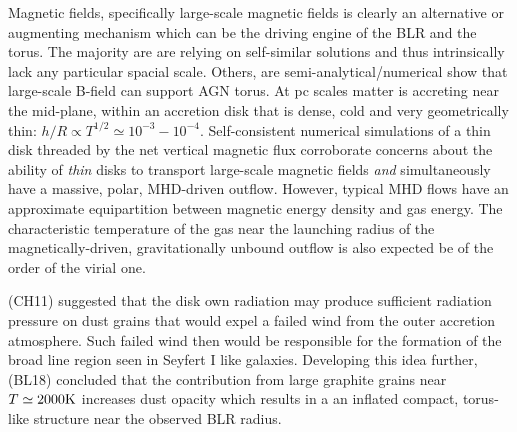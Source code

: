 \documentclass[12pt,english,preprint]{aastex}
\begin{document}
Magnetic fields, specifically large-scale magnetic fields 
is clearly an alternative or augmenting mechanism which can be the driving engine of the BLR and the torus. 
The majority are are relying on self-similar solutions \citep{Emmering92,Everett05,Keating12,KoniglKartje94} and thus intrinsically
lack any particular spacial scale. Others, are semi-analytical/numerical \citep{Lovelace98,Dorodnitsyn16} 
show that large-scale B-field can support AGN torus. At pc scales matter is accreting near the mid-plane, within an accretion
disk that is dense, cold and very geometrically thin: $h/R\propto T^{1/2}\simeq10^{-3}-10^{-4}$. 
Self-consistent numerical simulations of a 
thin disk threaded by the net vertical magnetic flux \citep{ZhuStone2018} corroborate concerns about the ability of \emph{thin} disks to 
transport large-scale magnetic fields \citep{LubowPapaloizou94,BKLovelace2000,BKLovelace2007} \emph{and} simultaneously have a 
massive, polar, MHD-driven outflow. However, typical MHD flows have an approximate equipartition between magnetic energy density and 
gas energy. The characteristic temperature of the gas near the launching radius of the magnetically-driven, 
gravitationally unbound outflow is also expected be of the order of the virial one.




% 












\citet{CzernyHryniewicz11}(CH11) suggested that the disk own radiation may produce sufficient
radiation pressure on dust grains that would expel a failed wind from the outer accretion atmosphere. 
Such failed wind then would be responsible for the formation of the broad line region seen
in Seyfert I like galaxies. Developing this idea further, \citep{BaskinLaor2018MNRAS}
(BL18) concluded that the contribution from large graphite grains
near $T\simeq2000{\rm K}$ increases dust opacity which results in
a an inflated compact, torus-like structure near the observed BLR radius. 
\end{document}
